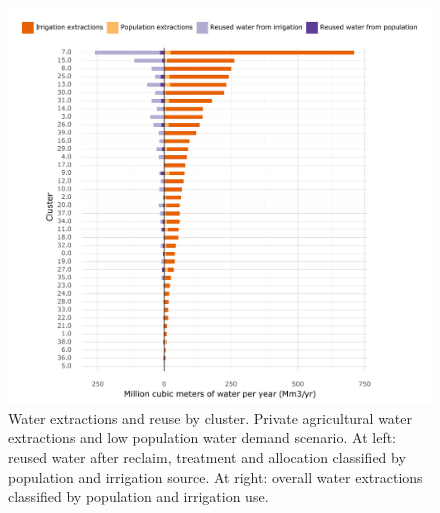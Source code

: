 \documentclass[12pt]{iopart}
\begin{document}
\begin{figure}[!h]
	\centering
	\includegraphics[width=\textwidth]{Priv_agri_water_Low_pop_water}
	\caption{Water extractions and reuse by cluster. Private agricultural water extractions and low population water demand scenario. At left: reused water after reclaim, treatment and allocation classified by population and irrigation source. At right: overall water extractions classified by population and irrigation use.}
	\label{fig:PrivAgLowPopWater}
\end{figure}
\newpage
\end{document}
